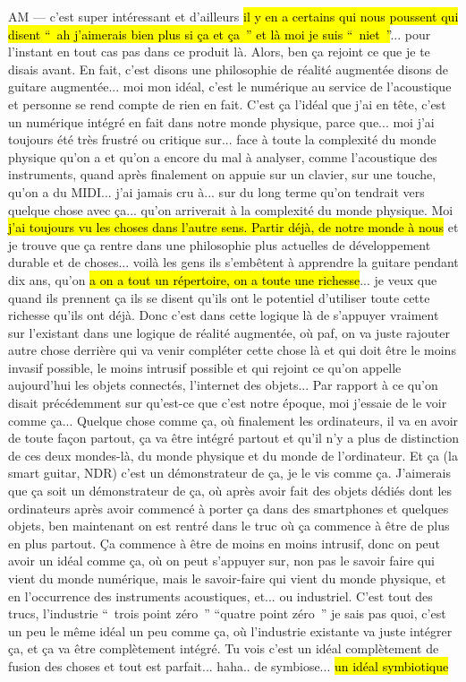 AM — c'est super intéressant et d'ailleurs \hl{il y en a certains qui nous poussent qui disent “ ah j'aimerais bien plus si ça et ça ” et là moi je suis “ niet ”}... pour l'instant en tout cas pas dans ce produit là. Alors, ben ça rejoint ce que je te disais avant. En fait, c'est disons une philosophie de réalité augmentée disons de guitare augmentée... moi mon idéal, c'est le numérique au service de l'acoustique et personne se rend compte de rien en fait. C'est ça l'idéal que j'ai en tête, c'est un numérique intégré en fait dans notre monde physique, parce que... moi j'ai toujours été très frustré ou critique sur... face à toute la complexité du monde physique qu'on a et qu'on a encore du mal à analyser, comme l'acoustique des instruments, quand après finalement on appuie sur un clavier, sur une touche, qu'on a du MIDI... j'ai jamais cru à... sur du long terme qu'on tendrait vers quelque chose avec ça... qu'on arriverait à la complexité du monde physique. Moi \hl{j'ai toujours vu les choses dans l'autre sens. Partir déjà, de notre monde à nous} et je trouve que ça rentre dans une philosophie plus actuelles de développement durable et de choses... voilà les gens ils s'embêtent à apprendre la guitare pendant dix ans, qu'on \hl{a on a tout un répertoire, on a toute une richesse}... je veux que quand ils prennent ça ils se disent qu'ils ont le potentiel d'utiliser toute cette richesse qu'ils ont déjà. Donc c'est dans cette logique là de s'appuyer vraiment sur l'existant dans une logique de réalité augmentée, où paf, on va juste rajouter autre chose derrière qui va venir compléter cette chose là et qui doit être le moins invasif possible, le moins intrusif possible et qui rejoint ce qu'on appelle aujourd'hui les objets connectés, l'internet des objets... Par rapport à ce qu'on disait précédemment sur qu'est-ce que c'est notre époque, moi j'essaie de le voir comme ça... Quelque chose comme ça, où finalement les ordinateurs, il va en avoir de toute façon partout, ça va être intégré partout et qu'il n'y a plus de distinction de ces deux mondes-là, du monde physique et du monde de l'ordinateur. Et ça (la smart guitar, NDR) c'est un démonstrateur de ça, je le vis comme ça. J'aimerais que ça soit un démonstrateur de ça, où après avoir fait des objets dédiés dont les ordinateurs après avoir commencé à porter ça dans des smartphones et quelques objets, ben maintenant on est rentré dans le truc où ça commence à être de plus en plus partout. Ça commence à être de moins en moins intrusif, donc on peut avoir un idéal comme ça, où on peut s'appuyer sur, non pas le savoir faire qui vient du monde numérique, mais le savoir-faire qui vient du monde physique, et en l'occurrence des instruments acoustiques, et... ou industriel. C'est tout des trucs, l'industrie “ trois point zéro ”  “quatre point zéro ” je sais pas quoi, c'est un peu le même idéal un peu comme ça, où l'industrie existante va juste intégrer ça, et ça va être complètement intégré. Tu vois c'est un idéal complètement de fusion des choses et tout est parfait... haha.. de symbiose... \hl{un idéal symbiotique}


